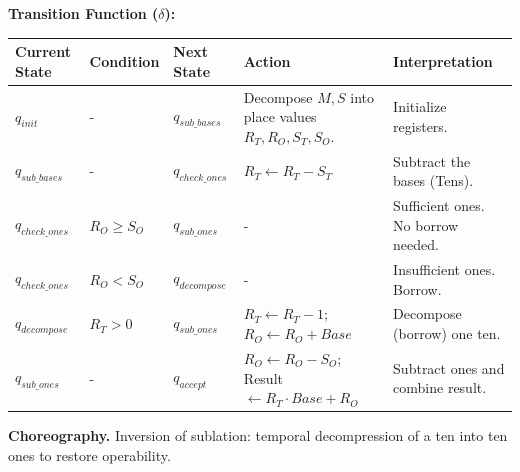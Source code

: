 \documentclass[12pt]{book}
\begin{document}
\textbf{Transition Function (\(\delta\)):}

\begin{longtable}[]{@{}
  >{\raggedright\arraybackslash}p{}
  >{\raggedright\arraybackslash}p{}
  >{\raggedright\arraybackslash}p{}
  >{\raggedright\arraybackslash}p{}
  >{\raggedright\arraybackslash}p{}@{}}
\toprule\noalign{}
\begin{minipage}[b]{\linewidth}\raggedright
Current State
\end{minipage} & \begin{minipage}[b]{\linewidth}\raggedright
Condition
\end{minipage} & \begin{minipage}[b]{\linewidth}\raggedright
Next State
\end{minipage} & \begin{minipage}[b]{\linewidth}\raggedright
Action
\end{minipage} & \begin{minipage}[b]{\linewidth}\raggedright
Interpretation
\end{minipage} \\
\midrule\noalign{}
\endhead
\bottomrule\noalign{}
\endlastfoot
\(q_{init}\) & - & \(q_{sub\_bases}\) & Decompose \(M, S\) into place
values \(R_T, R_O, S_T, S_O\). & Initialize registers. \\
\(q_{sub\_bases}\) & - & \(q_{check\_ones}\) &
\(R_T \leftarrow R_T - S_T\) & Subtract the bases (Tens). \\
\(q_{check\_ones}\) & \(R_O \ge S_O\) & \(q_{sub\_ones}\) & - &
Sufficient ones. No borrow needed. \\
\(q_{check\_ones}\) & \(R_O < S_O\) & \(q_{decompose}\) & - &
Insufficient ones. Borrow. \\
\(q_{decompose}\) & \(R_T > 0\) & \(q_{sub\_ones}\) &
\(R_T \leftarrow R_T - 1\); \(R_O \leftarrow R_O + Base\) & Decompose
(borrow) one ten. \\
\(q_{sub\_ones}\) & - & \(q_{accept}\) & \(R_O \leftarrow R_O - S_O\);
Result \(\leftarrow R_T \cdot Base + R_O\) & Subtract ones and combine
result. \\
\end{longtable}

\textbf{Choreography.} Inversion of sublation: temporal decompression of
a ten into ten ones to restore operability.
\end{document}
